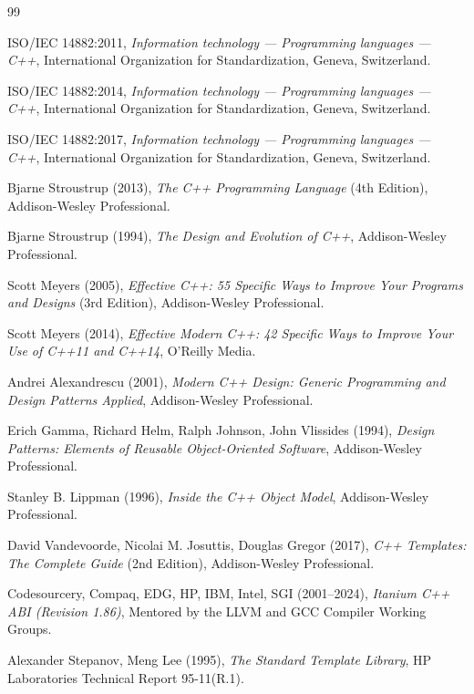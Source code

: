 \documentclass[12pt,a4paper,oneside]{book}
\begin{document}
\begin{thebibliography}{99}

ISO/IEC 14882:2011, \textit{Information technology --- Programming languages --- C++}, International Organization for Standardization, Geneva, Switzerland.

ISO/IEC 14882:2014, \textit{Information technology --- Programming languages --- C++}, International Organization for Standardization, Geneva, Switzerland.

ISO/IEC 14882:2017, \textit{Information technology --- Programming languages --- C++}, International Organization for Standardization, Geneva, Switzerland.

Bjarne Stroustrup (2013), \textit{The C++ Programming Language} (4th Edition), Addison-Wesley Professional.

Bjarne Stroustrup (1994), \textit{The Design and Evolution of C++}, Addison-Wesley Professional.

Scott Meyers (2005), \textit{Effective C++: 55 Specific Ways to Improve Your Programs and Designs} (3rd Edition), Addison-Wesley Professional.

Scott Meyers (2014), \textit{Effective Modern C++: 42 Specific Ways to Improve Your Use of C++11 and C++14}, O'Reilly Media.

Andrei Alexandrescu (2001), \textit{Modern C++ Design: Generic Programming and Design Patterns Applied}, Addison-Wesley Professional.

Erich Gamma, Richard Helm, Ralph Johnson, John Vlissides (1994), \textit{Design Patterns: Elements of Reusable Object-Oriented Software}, Addison-Wesley Professional.

Stanley B. Lippman (1996), \textit{Inside the C++ Object Model}, Addison-Wesley Professional.

David Vandevoorde, Nicolai M. Josuttis, Douglas Gregor (2017), \textit{C++ Templates: The Complete Guide} (2nd Edition), Addison-Wesley Professional.

Codesourcery, Compaq, EDG, HP, IBM, Intel, SGI (2001--2024), \textit{Itanium C++ ABI (Revision 1.86)}, Mentored by the LLVM and GCC Compiler Working Groups.

Alexander Stepanov, Meng Lee (1995), \textit{The Standard Template Library}, HP Laboratories Technical Report 95-11(R.1).

\end{thebibliography}
\end{document}
